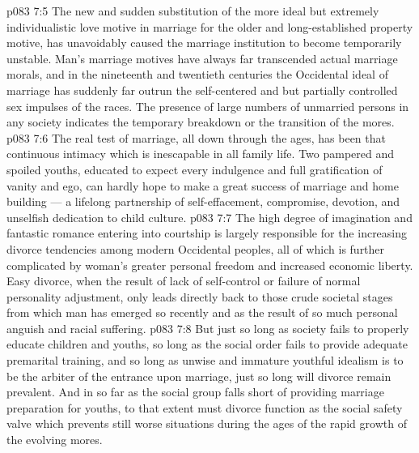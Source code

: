 \vs p083 7:5 The new and sudden substitution of the more ideal but extremely individualistic love motive in marriage for the older and long\hyp{}established property motive, has unavoidably caused the marriage institution to become temporarily unstable. Man’s marriage motives have always far transcended actual marriage morals, and in the nineteenth and twentieth centuries the Occidental ideal of marriage has suddenly far outrun the self\hyp{}centered and but partially controlled sex impulses of the races. The presence of large numbers of unmarried persons in any society indicates the temporary breakdown or the transition of the mores.
\vs p083 7:6 The real test of marriage, all down through the ages, has been that continuous intimacy which is inescapable in all family life. Two pampered and spoiled youths, educated to expect every indulgence and full gratification of vanity and ego, can hardly hope to make a great success of marriage and home building --- a lifelong partnership of self\hyp{}effacement, compromise, devotion, and unselfish dedication to child culture.
\vs p083 7:7 The high degree of imagination and fantastic romance entering into courtship is largely responsible for the increasing divorce tendencies among modern Occidental peoples, all of which is further complicated by woman’s greater personal freedom and increased economic liberty. Easy divorce, when the result of lack of self\hyp{}control or failure of normal personality adjustment, only leads directly back to those crude societal stages from which man has emerged so recently and as the result of so much personal anguish and racial suffering.
\vs p083 7:8 But just so long as society fails to properly educate children and youths, so long as the social order fails to provide adequate premarital training, and so long as unwise and immature youthful idealism is to be the arbiter of the entrance upon marriage, just so long will divorce remain prevalent. And in so far as the social group falls short of providing marriage preparation for youths, to that extent must divorce function as the social safety valve which prevents still worse situations during the ages of the rapid growth of the evolving mores.
